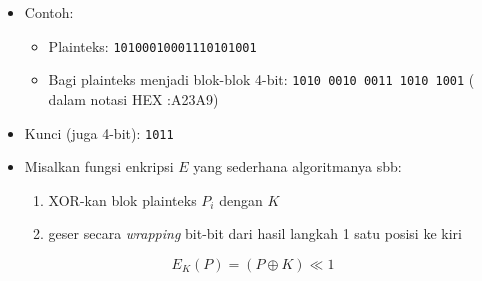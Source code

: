 \documentclass{article}
\begin{document}

\begin{itemize}
  \item Contoh:
  \begin{itemize}
    \item Plainteks: \texttt{10100010001110101001}
    \item Bagi plainteks menjadi blok-blok 4-bit:
    \texttt{1010 0010 0011 1010 1001}
    ( dalam notasi HEX :A23A9)
  \end{itemize}
  \item Kunci (juga 4-bit): \texttt{1011}
  \item Misalkan fungsi enkripsi $E$ yang sederhana algoritmanya sbb:
  \begin{enumerate}
    \item XOR-kan blok plainteks $P_i$ dengan $K$
    \item geser secara \textit{wrapping} bit-bit dari hasil langkah 1 satu posisi ke kiri
  \end{enumerate}
\end{itemize}

\[ E_K(P) = (P \oplus K) \ll 1 \]
\end{document}
